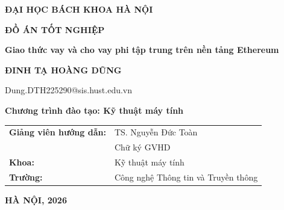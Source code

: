 \documentclass[DoAn.tex]{subfiles}
\begin{document}
\begin{titlepage}
\thispagestyle{empty}
\begin{center}
{\textbf{\large ĐẠI HỌC BÁCH KHOA HÀ NỘI}\par}

\vspace*{3cm}

{\textbf{\huge ĐỒ ÁN TỐT NGHIỆP}\par}
\vspace{1cm}
{\textbf{\Large Giao thức vay và cho vay phi tập trung trên nền tảng Ethereum}\par}
\vspace{1cm}

{\textbf{\large ĐINH TẠ HOÀNG DŨNG}\par}
{\large Dung.DTH225290@sis.hust.edu.vn\par}
\vspace{0.5cm}
{\textbf{\large Chương trình đào tạo: Kỹ thuật máy tính}\par}
\end{center}

\vfill

\noindent
\begin{tabular}{@{}p{}p{}@{}}
\textbf{Giảng viên hướng dẫn:} & TS. Nguyễn Đức Toàn \hfill \underline{\hspace{3cm}} \\[0.2cm]
 & \hfill Chữ ký GVHD \\[0.5cm]
\textbf{Khoa:} & Kỹ thuật máy tính \\[0.5cm]
\textbf{Trường:} & Công nghệ Thông tin và Truyền thông \\
\end{tabular}

\vfill

\begin{center}
\textbf{HÀ NỘI, 2026}
\end{center}

\end{titlepage}
\end{document}
